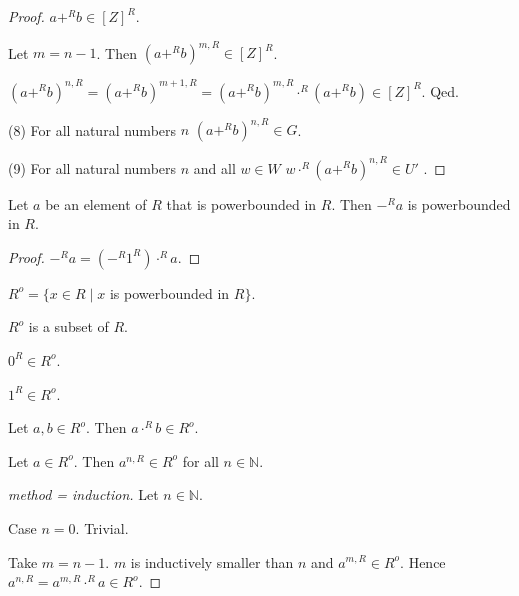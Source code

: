 \documentclass[11pt]{article}
\begin{document}
\begin{forthel}
\begin{proof}
$a +^{R} b \in [Z]^{R}$.

Let $m = n - 1$. Then $(a +^{R} b)^{m,R} \in [Z]^{R}$.

$(a +^{R} b)^{n,R} = (a +^{R} b)^{m+1,R}
= (a +^{R} b)^{m,R} \cdot^{R} (a +^{R} b) \in [Z]^{R}$.
Qed.

(8) For all natural numbers $n$ $(a +^{R} b)^{n,R} \in G$.

(9) For all natural numbers $n$ and all $w \in W$ 
$w \cdot^{R} (a +^{R} b)^{n,R} \in U'$ .

\end{proof}

\begin{lemma}[title = L 342]
Let $a$ be an element of $R$ that is powerbounded in $R$.
Then $-^{R} a$ is powerbounded in $R$.
\end{lemma}
\begin{proof}
$-^{R} a = (-^{R} 1^{R}) \cdot^{R} a$.
\end{proof}

\begin{definition}[title = L 310]  $R^o = \{x \in R \mid  x$ is powerbounded in $R\}$. 
\end{definition}

\begin{lemma} $R^o$ is a subset of $R$. \end{lemma}

\begin{lemma}[title = L 320]
$0^{R} \in R^o$.
\end{lemma}

\begin{lemma}[title = L 322] 
$1^{R} \in R^o$.
\end{lemma}

\begin{lemma}[title = L 324]
Let $a,b \in R^o$. Then $a \cdot^{R} b \in R^o$.
\end{lemma}

\begin{lemma}[title = L 324]
Let $a \in R^o$. Then $a^{n,R} \in R^o$ for all $n \in \mathbb{N}$.
\end{lemma}

\begin{proof}[method = induction]
Let $n \in \mathbb{N}$.

Case $n = 0$. Trivial.

Take $m = n - 1$. $m$ is inductively smaller than $n$ and $a^{m,R} \in R^o$.
Hence $a^{n,R} = a^{m,R} \cdot^{R} a \in R^o$.
\end{proof}


\end{forthel}
\end{document}
